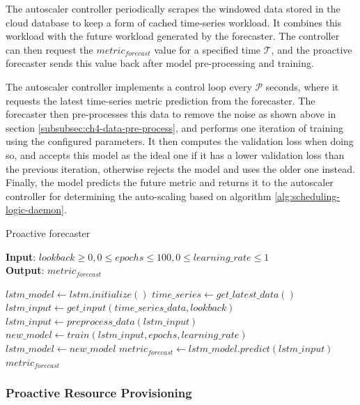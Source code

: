 The autoscaler controller periodically scrapes the windowed data stored in the cloud database to keep a form of cached time-series workload. It combines this workload with the future workload generated by the forecaster. The controller can then request the $metric_{forecast}$ value for a specified time $\mathcal{T}$, and the proactive forecaster sends this value back after model pre-processing and training.\par

The autoscaler controller implements a control loop every $\mathcal{P}$ seconds, where it requests the latest time-series metric prediction from the forecaster. The forecaster then pre-processes this data to remove the noise as shown above in section \ref{subsubsec:ch4-data-pre-process}, and performs one iteration of training using the configured parameters. It then computes the validation loss when doing so, and accepts this model as the ideal one if it has a lower validation loss than the previous iteration, otherwise rejects the model and uses the older one instead. Finally, the model predicts the future metric and returns it to the autoscaler controller for determining the auto-scaling based on algorithm \ref{alg:scheduling-logic-daemon}.\par

\begin{algorithm}
    \caption{Proactive forecaster}
    \label{alg:proactive-forecast-alg}
    \textbf{Input}: $lookback \geq 0, 0 \leq epochs \leq 100, 0 \leq learning\_rate \leq 1$\\
    \textbf{Output}: $metric_{forecast}$
    \begin{algorithmic}
        \State $lstm\_model \gets lstm.initialize()$
        \State $time\_series \gets get\_latest\_data()$
        \State $lstm\_input \gets get\_input(time\_series\_data, lookback)$
        \State $lstm\_input \gets preprocess\_data(lstm\_input)$
        \State $new\_model \gets train(lstm\_input, epochs, learning\_rate)$
            \State $lstm\_model \gets new\_model$
        \EndIf
        \State $metric_{forecast} \gets lstm\_model.predict(lstm\_input)$
        \State \Return $metric_{forecast}$
    \end{algorithmic}
\end{algorithm}

\subsubsection{Proactive Resource Provisioning}

